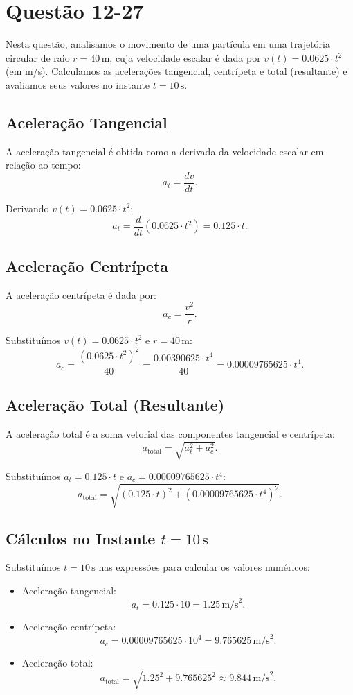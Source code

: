 \section{Questão 12-27}

Nesta questão, analisamos o movimento de uma partícula em uma trajetória circular de raio \(r = 40 \, \text{m}\), cuja velocidade escalar é dada por \(v(t) = 0.0625 \cdot t^2\) (em m/s). Calculamos as acelerações tangencial, centrípeta e total (resultante) e avaliamos seus valores no instante \(t = 10 \, \text{s}\).

\subsection*{Aceleração Tangencial}
A aceleração tangencial é obtida como a derivada da velocidade escalar em relação ao tempo:
\[
a_t = \frac{dv}{dt}.
\]

Derivando \(v(t) = 0.0625 \cdot t^2\):
\[
a_t = \frac{d}{dt}\left(0.0625 \cdot t^2\right) = 0.125 \cdot t.
\]

\subsection*{Aceleração Centrípeta}
A aceleração centrípeta é dada por:
\[
a_c = \frac{v^2}{r}.
\]

Substituímos \(v(t) = 0.0625 \cdot t^2\) e \(r = 40 \, \text{m}\):
\[
a_c = \frac{\left(0.0625 \cdot t^2\right)^2}{40} = \frac{0.00390625 \cdot t^4}{40} = 0.00009765625 \cdot t^4.
\]

\subsection*{Aceleração Total (Resultante)}
A aceleração total é a soma vetorial das componentes tangencial e centrípeta:
\[
a_{\text{total}} = \sqrt{a_t^2 + a_c^2}.
\]

Substituímos \(a_t = 0.125 \cdot t\) e \(a_c = 0.00009765625 \cdot t^4\):
\[
a_{\text{total}} = \sqrt{\left(0.125 \cdot t\right)^2 + \left(0.00009765625 \cdot t^4\right)^2}.
\]

\subsection*{Cálculos no Instante \(t = 10 \, \text{s}\)}
Substituímos \(t = 10 \, \text{s}\) nas expressões para calcular os valores numéricos:
\begin{itemize}
    \item Aceleração tangencial:
    \[
    a_t = 0.125 \cdot 10 = 1.25 \, \text{m/s}^2.
    \]
    \item Aceleração centrípeta:
    \[
    a_c = 0.00009765625 \cdot 10^4 = 9.765625 \, \text{m/s}^2.
    \]
    \item Aceleração total:
    \[
    a_{\text{total}} = \sqrt{1.25^2 + 9.765625^2} \approx 9.844 \, \text{m/s}^2.
    \]
\end{itemize}

